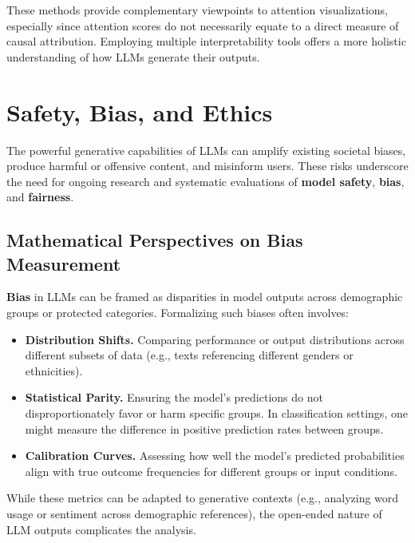 \noindent
These methods provide complementary viewpoints to attention visualizations, especially since attention scores do not necessarily equate to a direct measure of causal attribution. Employing multiple interpretability tools offers a more holistic understanding of how LLMs generate their outputs.


\section{Safety, Bias, and Ethics}
\label{sec:safety_bias_ethics}

\noindent
The powerful generative capabilities of LLMs can amplify existing societal biases, produce harmful or offensive content, and misinform users. These risks underscore the need for ongoing research and systematic evaluations of \textbf{model safety}, \textbf{bias}, and \textbf{fairness}.

\subsection{Mathematical Perspectives on Bias Measurement}
\noindent
\textbf{Bias} in LLMs can be framed as disparities in model outputs across demographic groups or protected categories. Formalizing such biases often involves:
\begin{itemize}
    \item \textbf{Distribution Shifts.} Comparing performance or output distributions across different subsets of data (e.g., texts referencing different genders or ethnicities).
    \item \textbf{Statistical Parity.} Ensuring the model’s predictions do not disproportionately favor or harm specific groups. In classification settings, one might measure the difference in positive prediction rates between groups.
    \item \textbf{Calibration Curves.} Assessing how well the model’s predicted probabilities align with true outcome frequencies for different groups or input conditions.
\end{itemize}
While these metrics can be adapted to generative contexts (e.g., analyzing word usage or sentiment across demographic references), the open-ended nature of LLM outputs complicates the analysis.

